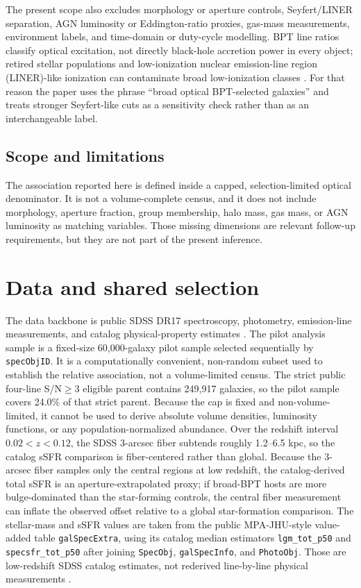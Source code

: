 \documentclass[twocolumn]{aastex631}
\begin{document}
The present scope also excludes morphology or aperture controls, Seyfert/LINER separation, AGN luminosity or Eddington-ratio proxies, gas-mass measurements, environment labels, and time-domain or duty-cycle modelling. BPT line ratios classify optical excitation, not directly black-hole accretion power in every object; retired stellar populations and low-ionization nuclear emission-line region (LINER)-like ionization can contaminate broad low-ionization classes \citep{stasinska2008,stasinska2015}. For that reason the paper uses the phrase ``broad optical BPT-selected galaxies'' and treats stronger Seyfert-like cuts as a sensitivity check rather than as an interchangeable label.

\subsection{Scope and limitations}
The association reported here is defined inside a capped, selection-limited optical denominator. It is not a volume-complete census, and it does not include morphology, aperture fraction, group membership, halo mass, gas mass, or AGN luminosity as matching variables. Those missing dimensions are relevant follow-up requirements, but they are not part of the present inference.

\section{Data and shared selection}
The data backbone is public SDSS DR17 spectroscopy, photometry, emission-line measurements, and catalog physical-property estimates \citep{york2000,sdssdr17,brinchmann2004}. The pilot analysis sample is a fixed-size 60,000-galaxy pilot sample selected sequentially by \texttt{specObjID}. It is a computationally convenient, non-random subset used to establish the relative association, not a volume-limited census. The strict public four-line S/N$\geq3$ eligible parent contains 249,917 galaxies, so the pilot sample covers 24.0\% of that strict parent. Because the cap is fixed and non-volume-limited, it cannot be used to derive absolute volume densities, luminosity functions, or any population-normalized abundance.
Over the redshift interval $0.02<z<0.12$, the SDSS 3-arcsec fiber subtends roughly 1.2--6.5 kpc, so the catalog sSFR comparison is fiber-centered rather than global.
Because the 3-arcsec fiber samples only the central regions at low redshift, the catalog-derived total sSFR is an aperture-extrapolated proxy; if broad-BPT hosts are more bulge-dominated than the star-forming controls, the central fiber measurement can inflate the observed offset relative to a global star-formation comparison.
The stellar-mass and sSFR values are taken from the public MPA-JHU-style value-added table \texttt{galSpecExtra}, using its catalog median estimators \texttt{lgm\_tot\_p50} and \texttt{specsfr\_tot\_p50} after joining \texttt{SpecObj}, \texttt{galSpecInfo}, and \texttt{PhotoObj}. Those are low-redshift SDSS catalog estimates, not rederived line-by-line physical measurements \citep{brinchmann2004,sdssdr17,york2000}.
\end{document}
